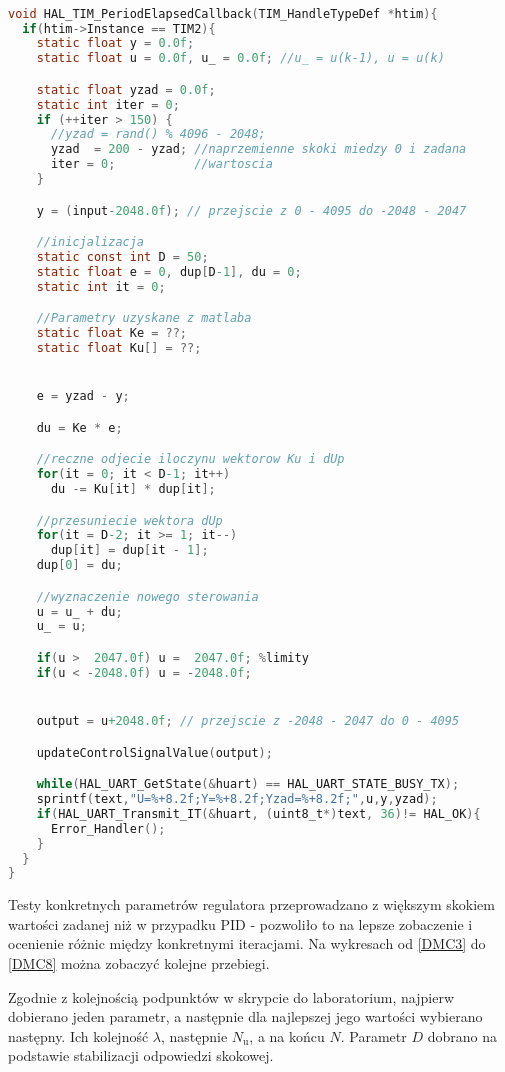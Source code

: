 \begin{lstlisting}[language=C]

void HAL_TIM_PeriodElapsedCallback(TIM_HandleTypeDef *htim){
  if(htim->Instance == TIM2){
    static float y = 0.0f;
    static float u = 0.0f, u_ = 0.0f; //u_ = u(k-1), u = u(k)

    static float yzad = 0.0f;
    static int iter = 0;
    if (++iter > 150) {
      //yzad = rand() % 4096 - 2048;
      yzad  = 200 - yzad; //naprzemienne skoki miedzy 0 i zadana
      iter = 0;           //wartoscia
    }

    y = (input-2048.0f); // przejscie z 0 - 4095 do -2048 - 2047

	//inicjalizacja
    static const int D = 50;
    static float e = 0, dup[D-1], du = 0;
    static int it = 0;

    //Parametry uzyskane z matlaba
    static float Ke = ??;
    static float Ku[] = ??;


    e = yzad - y;

    du = Ke * e;

    //reczne odjecie iloczynu wektorow Ku i dUp
    for(it = 0; it < D-1; it++)
      du -= Ku[it] * dup[it];

	//przesuniecie wektora dUp
    for(it = D-2; it >= 1; it--)
      dup[it] = dup[it - 1];
    dup[0] = du;

	//wyznaczenie nowego sterowania
    u = u_ + du;
    u_ = u;

    if(u >  2047.0f) u =  2047.0f; %limity
    if(u < -2048.0f) u = -2048.0f;


    output = u+2048.0f; // przejscie z -2048 - 2047 do 0 - 4095

    updateControlSignalValue(output);

    while(HAL_UART_GetState(&huart) == HAL_UART_STATE_BUSY_TX);
    sprintf(text,"U=%+8.2f;Y=%+8.2f;Yzad=%+8.2f;",u,y,yzad);
    if(HAL_UART_Transmit_IT(&huart, (uint8_t*)text, 36)!= HAL_OK){
      Error_Handler();
    }
  }
}
\end{lstlisting}

Testy konkretnych parametrów regulatora przeprowadzano z większym skokiem wartości zadanej niż w przypadku PID - pozwoliło to na lepsze zobaczenie i ocenienie różnic między konkretnymi iteracjami. Na wykresach od \ref{DMC3} do \ref{DMC8} można zobaczyć kolejne przebiegi.

Zgodnie z kolejnością podpunktów w skrypcie do laboratorium, najpierw dobierano jeden parametr, a następnie dla najlepszej jego wartości wybierano następny. Ich kolejność $ \lambda $, następnie $ N_\mathrm{u} $, a na końcu $ N $. Parametr $ D $ dobrano na podstawie stabilizacji odpowiedzi skokowej.

